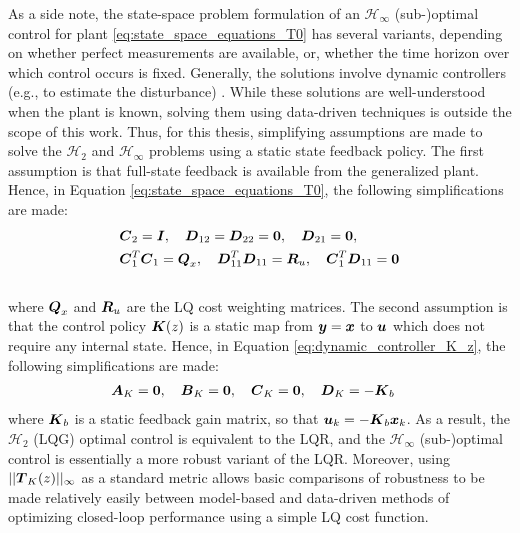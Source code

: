 As a side note, the state-space problem formulation of an $\mathcal{H}_{\infty}$ (sub-)optimal control for plant \eqref{eq:state_space_equations_T0} has several variants, depending on whether perfect measurements are available, or, whether the time horizon over which control occurs is fixed.  Generally, the solutions involve dynamic controllers (e.g., to estimate the disturbance) \cite{basar1989dynamic, bacsar2008h}.  While these solutions are well-understood when the plant is known, solving them using data-driven techniques is outside the scope of this work.  Thus, for this thesis, simplifying assumptions are made to solve the $\mathcal{H}_{2}$ and $\mathcal{H}_{\infty}$ problems using a static state feedback policy.  The first assumption is that full-state feedback is available from the generalized plant.  Hence, in Equation \eqref{eq:state_space_equations_T0}, the following simplifications are made:\vspace{5pt}
\begin{equation}
\label{eq:lq_performance}
\begin{aligned}
	&\vb*{C}_{2} = \vb*{I}, \hspace{10pt}
	\vb*{D}_{12} = \vb*{D}_{22} = \vb*{0}, \hspace{10pt}
	\vb*{D}_{21} = \vb*{0},\\
	&\vb*{C}_{1}^{T}\vb*{C}_{1} =  \vb*{Q}_{x}, \hspace{10pt}
	\vb*{D}_{11}^{T}\vb*{D}_{11} = \vb*{R}_{u}, \hspace{10pt}
	\vb*{C}_{1}^{T} \vb*{D}_{11} = \vb*{0}
\end{aligned}
\vspace{-15pt}
\end{equation}\\
where $\vb*{Q}_{x}$ and $\vb*{R}_{u}$ are the LQ cost weighting matrices.  The second assumption is that the control policy $\vb*{K}(z)$ is a static map from $\vb*{y} = \vb*{x}$ to $\vb*{u}$ which does not require any internal state.  Hence, in Equation \eqref{eq:dynamic_controller_K_z}, the following simplifications are made:
\begin{equation}
\label{eq:controller_simplifications}
\begin{aligned}
	&\vb*{A}_{K} = \vb*{0}, \hspace{10pt}
	\vb*{B}_{K} = \vb*{0}, \hspace{10pt}
	\vb*{C}_{K} = \vb*{0}, \hspace{10pt}
	\vb*{D}_{K} = -\vb*{K}_{b}
\end{aligned}
\end{equation}
where $\vb*{K}_{b}$ is a static feedback gain matrix, so that $\vb*{u}_{k} = -\vb*{K}_{b}\vb*{x}_{k}$.  As a result, the $\mathcal{H}_{2}$ (LQG) optimal control is equivalent to the LQR, and the $\mathcal{H}_{\infty}$ (sub-)optimal control is essentially a more robust variant of the LQR.  Moreover, using $||\vb*{T}_{K}(z)||_{\infty}$ as a standard metric allows basic comparisons of robustness to be made relatively easily between model-based and data-driven methods of optimizing closed-loop performance using a simple LQ cost function.


